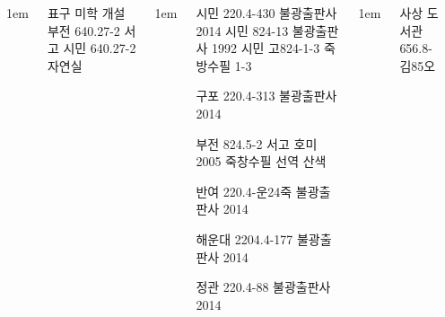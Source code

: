 \documentclass[	20pt, 
							a1paper, 
							portrait, %
							margin=0mm, %
							innermargin=10mm,  		%
							colspace=5mm, 
							subcolspace=0mm
							]{tikzposter}
\begin{document}
\begin{columns}
{\begin{LARGE}
				\end{LARGE}
			}


			{
					\setlength{\leftmargini}{4em}
					\setlength{\labelsep} {1em}
				\begin{LARGE}
표구 미학 개설
부전  640.27-2  서고  		%
시민  640.27-2  자연실  	%
				\end{LARGE}
			}



			{
					\setlength{\leftmargini}{4em}
					\setlength{\labelsep} {1em}
				\begin{LARGE}

시민  220.4-430  불광출판사 2014       
시민  824-13  불광출판사 1992
시민  고824-1-3  죽방수필 1-3  

구포  220.4-313  불광출판사 2014       %

부전  824.5-2  서고  호미 2005  죽창수필 선역 산색  %

반여  220.4-운24죽  불광출판사 2014  %

해운대 2204.4-177 불광출판사 2014   %

정관  220.4-88 불광출판사 2014         %

				\end{LARGE}
			}







			{
					\setlength{\leftmargini}{4em}
					\setlength{\labelsep} {1em}
				\begin{LARGE}
사상 도서관  656.8-김85오  %


\end{LARGE}}
\end{columns}
\end{document}
